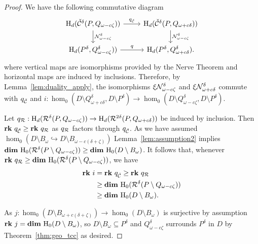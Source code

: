 \begin{proof}
  We have the following commutative diagram
  \[\begin{tikzcd}
    \hom_d(\cech^\delta(P, Q_{\omega-c\zeta})) \arrow{r}{q_{\cech}}\arrow{d}{\N_{\omega-c\zeta}^{\delta}} &
    \hom_d(\cech^\delta(P, Q_{\omega+c\delta})) \arrow{d}{\N_{\omega-c\zeta}^\delta}\\
    \hom_d(P^\delta, Q_{\omega-c\zeta}^\delta))\arrow{r}{q} &
    \hom_d(P^\delta, Q_{\omega+c\delta}^\delta).
  \end{tikzcd}\]
  where vertical maps are isomorphisms provided by the Nerve Theorem and horizontal maps are induced by inclusions.
  Therefore, by Lemma~\ref{lem:duality_apply}, the isomorphisms $\xi\mathcal{N}_{\omega-c\zeta}^\delta$ and $\xi\mathcal{N}_{\omega+c\delta}^\delta$ commute with $q_{\check{\mathcal{C}}}$ and $i : \hom_0(D\setminus Q_{\omega+c\delta}^\delta, D\setminus P^\delta)\to \hom_0(D\setminus Q_{\omega-c\zeta}^\delta, D\setminus P^\delta)$.

  Let $q_{\mathcal{R}} : \mathrm{H}_d(\mathcal{R}^{\delta}(P, Q_{\omega-c\zeta}))\to\mathrm{H}_d(\mathcal{R}^{2\delta}(P, Q_{\omega+c\delta}))$ be induced by inclusion.
  Then $\mathbf{rk}~q_{\check{\mathcal{C}}} \geq\mathbf{rk}~q_{\mathcal{R}}$ as $q_{\mathcal{R}}$ factors through $q_{\check{\mathcal{C}}}$.
  As we have assumed $\hom_0(D\setminus B_\omega\hookrightarrow D\setminus B_{\omega-c(\delta+\zeta)})$ Lemma~\ref{lem:assumption2} implies $\mathbf{dim}~\mathrm{H}_0(\mathcal{R}^\delta(P\setminus Q_{\omega-c\zeta}))\geq \mathbf{dim}~\mathrm{H}_0(D\setminus B_\omega)$.
  It follows that, whenever $\mathbf{rk}~q_{\mathcal{R}} \geq \mathbf{dim}~\mathrm{H}_0(\mathcal{R}^\delta(P\setminus Q_{\omega-c\zeta}))$, we have
  \begin{align*}
    \mathbf{rk}~i &= \mathbf{rk}~q_{\check{\mathcal{C}}} \geq \mathbf{rk}~q_{\mathcal{R}}\\
      &\geq \mathbf{dim}~\mathrm{H}_0(\mathcal{R}^\delta(P\setminus Q_{\omega-c\zeta}))\\
      &\geq \mathbf{dim}~\mathrm{H}_0(D\setminus B_\omega).
  \end{align*}

  As $j : \hom_0(D\setminus B_{\omega+c(\delta+\zeta)})\to \hom_0(D\setminus B_\omega)$ is surjective by assumption $\mathbf{rk}~j = \mathbf{dim}~\mathrm{H}_0(D\setminus B_\omega)$, so $D\setminus B_\omega\subseteq P^\delta$ and $Q_{\omega-c\zeta}^\delta$ surrounds $P^\delta$ in $D$ by Theorem~\ref{thm:geo_tcc} as desired.
\end{proof}
